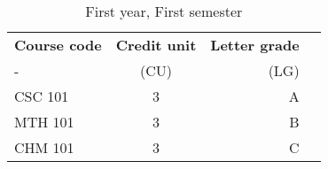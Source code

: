 \documentclass{article}
\begin{document}
  
	\begin{table}[h!]
		\begin{center}
			\caption{First year, First semester}
			\label{tab:table1}
			\begin{tabular}{l|c|r|c}
				\textbf{Course code}& \textbf{Credit unit} &
				\textbf{Letter grade} \\
				- & (CU) & (LG) \\
				\hline
				CSC 101 & 3 & A\\
				MTH 101 & 3 & B\\
				CHM 101 & 3 & C\\
			\end{tabular}
		\end{center}
	\end{table}
				
			
\end{document}
